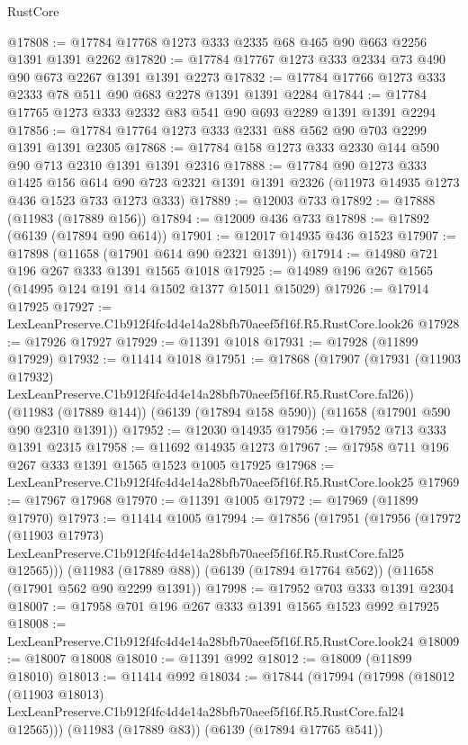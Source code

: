 \begin{lexlean}{RustCore}
\begin{coremodule}
@17808 := @17784 @17768 @1273 @333 @2335 @68 @465 @90 @663 @2256 @1391 @1391 @2262
@17820 := @17784 @17767 @1273 @333 @2334 @73 @490 @90 @673 @2267 @1391 @1391 @2273
@17832 := @17784 @17766 @1273 @333 @2333 @78 @511 @90 @683 @2278 @1391 @1391 @2284
@17844 := @17784 @17765 @1273 @333 @2332 @83 @541 @90 @693 @2289 @1391 @1391 @2294
@17856 := @17784 @17764 @1273 @333 @2331 @88 @562 @90 @703 @2299 @1391 @1391 @2305
@17868 := @17784 @158 @1273 @333 @2330 @144 @590 @90 @713 @2310 @1391 @1391 @2316
@17888 := @17784
    @90
    @1273
    @333
    @1425
    @156
    @614
    @90
    @723
    @2321
    @1391
    @1391
    @2326
    (@11973 @14935 @1273 @436 @1523 @733 @1273 @333)
@17889 := @12003 @733
@17892 := @17888 (@11983 (@17889 @156))
@17894 := @12009 @436 @733
@17898 := @17892 (@6139 (@17894 @90 @614))
@17901 := @12017 @14935 @436 @1523
@17907 := @17898 (@11658 (@17901 @614 @90 @2321 @1391))
@17914 := @14980 @721 @196 @267 @333 @1391 @1565 @1018
@17925 := @14989 @196 @267 @1565 (@14995 @124 @191 @14 @1502 @1377 @15011 @15029)
@17926 := @17914 @17925
@17927 := LexLeanPreserve.C1b912f4fc4d4e14a28bfb70aeef5f16f.R5.RustCore.look26
@17928 := @17926 @17927
@17929 := @11391 @1018
@17931 := @17928 (@11899 @17929)
@17932 := @11414 @1018
@17951 := @17868
    (@17907
      (@17931 (@11903 @17932) LexLeanPreserve.C1b912f4fc4d4e14a28bfb70aeef5f16f.R5.RustCore.fal26))
    (@11983 (@17889 @144))
    (@6139 (@17894 @158 @590))
    (@11658 (@17901 @590 @90 @2310 @1391))
@17952 := @12030 @14935
@17956 := @17952 @713 @333 @1391 @2315
@17958 := @11692 @14935 @1273
@17967 := @17958 @711 @196 @267 @333 @1391 @1565 @1523 @1005 @17925
@17968 := LexLeanPreserve.C1b912f4fc4d4e14a28bfb70aeef5f16f.R5.RustCore.look25
@17969 := @17967 @17968
@17970 := @11391 @1005
@17972 := @17969 (@11899 @17970)
@17973 := @11414 @1005
@17994 := @17856
    (@17951
      (@17956
        (@17972
          (@11903 @17973)
          LexLeanPreserve.C1b912f4fc4d4e14a28bfb70aeef5f16f.R5.RustCore.fal25
          @12565)))
    (@11983 (@17889 @88))
    (@6139 (@17894 @17764 @562))
    (@11658 (@17901 @562 @90 @2299 @1391))
@17998 := @17952 @703 @333 @1391 @2304
@18007 := @17958 @701 @196 @267 @333 @1391 @1565 @1523 @992 @17925
@18008 := LexLeanPreserve.C1b912f4fc4d4e14a28bfb70aeef5f16f.R5.RustCore.look24
@18009 := @18007 @18008
@18010 := @11391 @992
@18012 := @18009 (@11899 @18010)
@18013 := @11414 @992
@18034 := @17844
    (@17994
      (@17998
        (@18012
          (@11903 @18013)
          LexLeanPreserve.C1b912f4fc4d4e14a28bfb70aeef5f16f.R5.RustCore.fal24
          @12565)))
    (@11983 (@17889 @83))
    (@6139 (@17894 @17765 @541))

\end{coremodule}
\end{lexlean}
